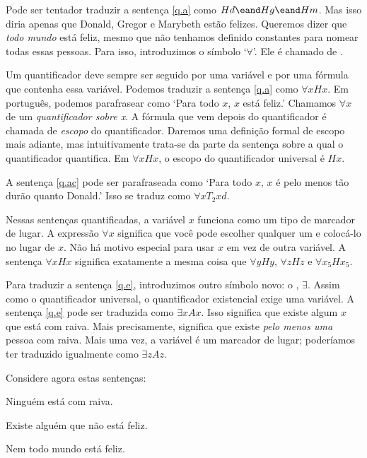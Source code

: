 Pode ser tentador traduzir a sentença \ref{q.a} como $Hd \eand Hg \eand Hm$. Mas isso diria apenas que Donald, Gregor e Marybeth estão felizes. Queremos dizer que \emph{todo mundo} está feliz, mesmo que não tenhamos definido constantes para nomear todas essas pessoas. Para isso, introduzimos o símbolo `$\forall$'. Ele é chamado de .

Um quantificador deve sempre ser seguido por uma variável e por uma fórmula que contenha essa variável. Podemos traduzir a sentença \ref{q.a} como $\forall x Hx$. Em português, podemos parafrasear como `Para todo $x$, $x$ está feliz.'
Chamamos $\forall x$ de um \emph{quantificador sobre x}. A fórmula que vem depois do quantificador é chamada de \emph{escopo} do quantificador. Daremos uma definição formal de escopo mais adiante, mas intuitivamente trata-se da parte da sentença sobre a qual o quantificador quantifica. Em $\forall x Hx$, o escopo do quantificador universal é $Hx$.

A sentença \ref{q.ac} pode ser parafraseada como `Para todo $x$, $x$ é pelo menos tão durão quanto Donald.' Isso se traduz como $\forall x T_2xd$.

Nessas sentenças quantificadas, a variável $x$ funciona como um tipo de marcador de lugar. A expressão $\forall x$ significa que você pode escolher qualquer um e colocá-lo no lugar de $x$. Não há motivo especial para usar $x$ em vez de outra variável. A sentença $\forall x Hx$ significa exatamente a mesma coisa que $\forall y Hy$, $\forall z Hz$ e $\forall x_5 Hx_5$.

Para traduzir a sentença \ref{q.e}, introduzimos outro símbolo novo: o , $\exists$. Assim como o quantificador universal, o quantificador existencial exige uma variável. A sentença \ref{q.e} pode ser traduzida como $\exists x Ax$. Isso significa que existe algum $x$ que está com raiva. Mais precisamente, significa que existe \emph{pelo menos uma} pessoa com raiva. Mais uma vez, a variável é um marcador de lugar; poderíamos ter traduzido igualmente como $\exists z Az$.

Considere agora estas sentenças:
\begin{earg}
\item[\ex{q.ne}] Ninguém está com raiva.
\item[\ex{q.en}] Existe alguém que não está feliz.
\item[\ex{q.na}] Nem todo mundo está feliz.
\end{earg}


